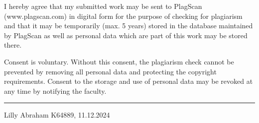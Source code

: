 \documentclass{report} %
\begin{document}
\noindent I hereby agree that my submitted work may be sent to PlagScan (www.plagscan.com) in digital form for the purpose of checking for plagiarism and that it 
may be temporarily (max. 5 years) stored in the database maintained by PlagScan as well as personal data which are part of this work may be stored there.

\vspace{0.5cm}

\noindent Consent is voluntary. Without this consent, the plagiarism check cannot be prevented by removing all personal data and protecting the copyright requirements. 
Consent to the storage and use of personal data may be revoked at any time by notifying the faculty.

\vspace{3cm}
\hfill\rule{15cm}{0.4pt} 

\begin{center}
    Lilly Abraham K64889, 11.12.2024 
\end{center}
\end{document}
